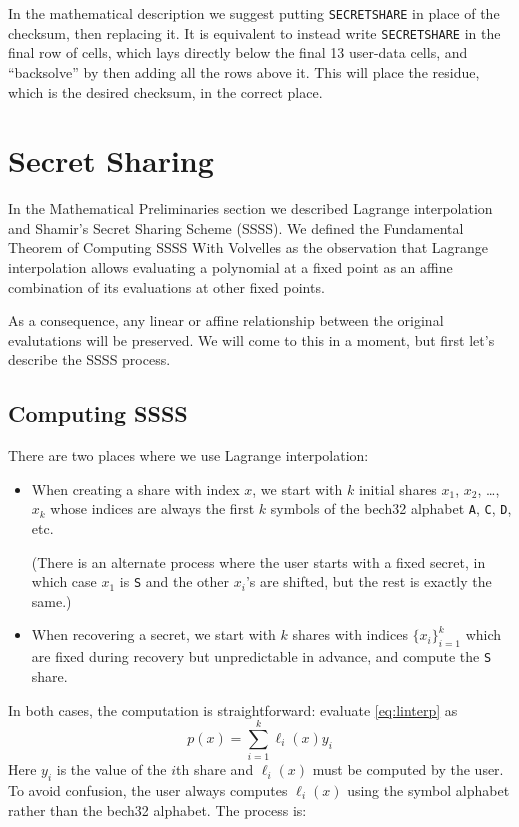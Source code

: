 \documentclass[letterpaper]{article}
\theoremstyle{xxx}
\theoremstyle{evil}
\theoremstyle{yyy}
\theoremstyle{plain}
\theoremstyle{zzz}
\begin{document}
In the mathematical description we suggest putting \texttt{SECRETSHARE} in place of
the checksum, then replacing it. It is equivalent to instead write \texttt{SECRETSHARE}
in the final row of cells, which lays directly below the final 13 user-data cells, and
``backsolve'' by then adding all the rows above it. This will place the residue, which
is the desired checksum, in the correct place.

\section{Secret Sharing}

In the Mathematical Preliminaries section we described Lagrange interpolation and
Shamir's Secret Sharing Scheme (SSSS). We defined the Fundamental Theorem of Computing
SSSS With Volvelles as the observation that Lagrange interpolation allows evaluating
a polynomial at a fixed point as an affine combination of its evaluations at other
fixed points.

As a consequence, any linear or affine relationship between the original evalutations
will be preserved. We will come to this in a moment, but first let's describe the SSSS
process.

\subsection{Computing SSSS}

There are two places where we use Lagrange interpolation:
\begin{itemize}
\item When creating a share with index $x$, we start with $k$ initial shares $x_1$,
$x_2$, \ldots, $x_k$ whose indices are always the first $k$ symbols of the bech32
alphabet \texttt{A}, \texttt{C}, \texttt{D}, etc.

(There is an alternate process where the user starts with a fixed secret, in which
case $x_1$ is \texttt{S} and the other $x_i$'s are shifted, but the rest is exactly
the same.)
\item When recovering a secret, we start with $k$ shares with indices $\{x_i\}_{i=1}^k$
which are fixed during recovery but unpredictable in advance, and compute the
\texttt{S} share.
\end{itemize}

In both cases, the computation is straightforward: evaluate \eqref{eq:linterp} as
\[ p(x) = \sum_{i=1}^k \ell_i(x) y_i \]
Here $y_i$ is the value of the $i$th share and $\ell_i(x)$ must be computed by the
user. To avoid confusion, the user always computes $\ell_i(x)$ using the symbol
alphabet rather than the bech32 alphabet. The process is:
\end{document}

